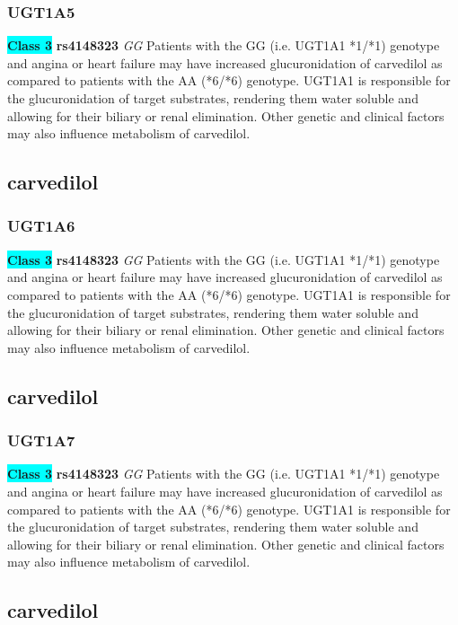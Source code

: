 \documentclass{book}
\begin{document}
\subsubsection{ UGT1A5 }

\begin{center}
\textbf{\colorbox{cyan} {Class 3}} \textbf{ rs4148323 } \textit{ GG }
Patients with the GG (i.e. UGT1A1 *1/*1) genotype and angina or heart failure may have increased glucuronidation of carvedilol as compared to patients with the AA (*6/*6) genotype. UGT1A1 is responsible for the glucuronidation of target substrates, rendering them water soluble and allowing for their biliary or renal elimination. Other genetic and clinical factors may also influence metabolism of carvedilol.


\end{center}\subsection{ carvedilol }


\subsubsection{ UGT1A6 }

\begin{center}
\textbf{\colorbox{cyan} {Class 3}} \textbf{ rs4148323 } \textit{ GG }
Patients with the GG (i.e. UGT1A1 *1/*1) genotype and angina or heart failure may have increased glucuronidation of carvedilol as compared to patients with the AA (*6/*6) genotype. UGT1A1 is responsible for the glucuronidation of target substrates, rendering them water soluble and allowing for their biliary or renal elimination. Other genetic and clinical factors may also influence metabolism of carvedilol.


\end{center}\subsection{ carvedilol }


\subsubsection{ UGT1A7 }

\begin{center}
\textbf{\colorbox{cyan} {Class 3}} \textbf{ rs4148323 } \textit{ GG }
Patients with the GG (i.e. UGT1A1 *1/*1) genotype and angina or heart failure may have increased glucuronidation of carvedilol as compared to patients with the AA (*6/*6) genotype. UGT1A1 is responsible for the glucuronidation of target substrates, rendering them water soluble and allowing for their biliary or renal elimination. Other genetic and clinical factors may also influence metabolism of carvedilol.


\end{center}\subsection{ carvedilol }
\end{document}
